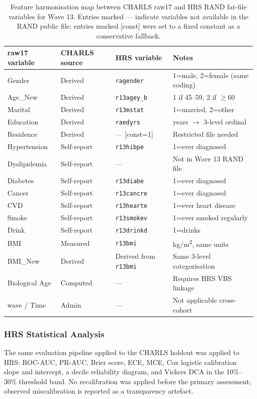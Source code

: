 \documentclass[11pt,a4paper]{article}
\begin{document}
\begin{table}[h!]
\centering
\small
\caption{Feature harmonisation map between CHARLS raw17 and HRS RAND fat-file variables for Wave 13.
Entries marked --- indicate variables not available in the RAND public file; entries marked [const]
were set to a fixed constant as a conservative fallback.}
\label{tab:hrs-harmonisation}
\begin{tabular}{lllp{4cm}}
\toprule
raw17 variable & CHARLS source & HRS variable & Notes \\
\midrule
Gender & Derived & \texttt{ragender} & 1=male, 2=female (same coding) \\
Age\_New & Derived & \texttt{r13agey\_b} & 1 if 45--59, 2 if $\geq 60$ \\
Marital & Derived & \texttt{r13mstat} & 1=married, 2=other \\
Education & Derived & \texttt{raedyrs} & years $\rightarrow$ 3-level ordinal \\
Residence & Derived & --- [const=1] & Restricted file needed \\
Hypertension & Self-report & \texttt{r13hibpe} & 1=ever diagnosed \\
Dyslipidemia & Self-report & --- & Not in Wave 13 RAND file \\
Diabetes & Self-report & \texttt{r13diabe} & 1=ever diagnosed \\
Cancer & Self-report & \texttt{r13cancre} & 1=ever diagnosed \\
CVD & Self-report & \texttt{r13hearte} & 1=ever heart disease \\
Smoke & Self-report & \texttt{r13smokev} & 1=ever smoked regularly \\
Drink & Self-report & \texttt{r13drinkd} & 1=drinks \\
BMI & Measured & \texttt{r13bmi} & kg/m\textsuperscript{2}, same units \\
BMI\_New & Derived & Derived from \texttt{r13bmi} & Same 3-level categorisation \\
Biological Age & Computed & --- & Requires HRS VBS linkage \\
wave / Time & Admin & --- & Not applicable cross-cohort \\
\bottomrule
\end{tabular}
\end{table}

\subsubsection*{HRS Statistical Analysis}
The same evaluation pipeline applied to the CHARLS holdout was applied to HRS: ROC-AUC, PR-AUC,
Brier score, ECE, MCE, Cox logistic calibration slope and intercept, a decile reliability diagram,
and Vickers DCA in the 10\%--30\% threshold band. No recalibration was applied before the primary
assessment; observed miscalibration is reported as a transparency artefact.
\end{document}

